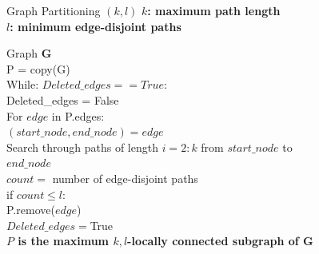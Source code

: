 \documentclass[xcolor=dvipsnames,10pt]{beamer}
\begin{document}
\begin{frame}{Graph Partitioning $(k,l)$}
\textbf{$k$: maximum path length}\\
\textbf{$l$: minimum edge-disjoint paths}
\vspace{.15in}
\begin{spacing}{1}
Graph \textbf{G}\\
P = copy(G)\\
While: $Deleted\_edges == True$:\\
\hspace*{20pt} Deleted\_edges = False\\
\hspace*{20pt} For $edge$ in P.edges:\\
\hspace*{40pt} $(start\_node, end\_node) = edge$\\
\hspace*{40pt} Search through paths of length $i=2:k$ from $start\_node$ to \\
\hspace*{245pt}$end\_node$\\
\hspace*{40pt} $count =$  number of edge-disjoint paths\\
\hspace*{40pt} if $count \leq l$:\\
\hspace*{60pt} P.remove($edge$)\\
\hspace*{60pt} $Deleted\_edges = $True\\
\vspace{.15in}
\textbf{$P$ is the maximum $k,l$-locally connected subgraph of G}
\end{spacing}	
\end{frame}
\end{document}
